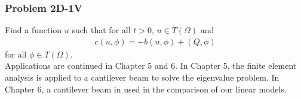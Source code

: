 \documentclass[../../main.tex]{subfiles}
\begin{document}
\subsubsection{Problem 2D-1V}\label{sssec:2D_Model:Problem2D1V}
Find a function $u$ such that for all $t>0$, $u \in T(\Omega)$ and 
\begin{align}
	c(u,\phi) = -b(u,\phi) + (Q,\phi) \label{eq:2D_Model:Problem2D1VEq}
\end{align}
for all $\phi \in T(\Omega)$.\\

 Applications are continued in Chapter 5 and 6. In Chapter 5, the finite element analysis is applied to a cantilever beam to solve the eigenvalue problem. In Chapter 6, a cantilever beam in used in the comparison of our linear models.
\end{document}
